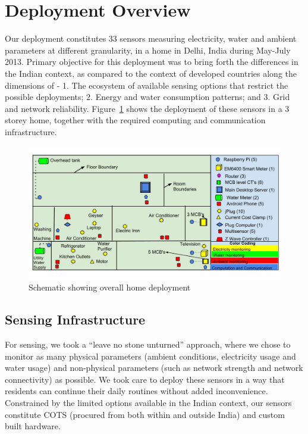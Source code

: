 \documentclass[10pt]{sensys-proc}
\newcommand{\figref}[1]{Figure~\ref{#1}}
\begin{document}
\section{Deployment Overview}
Our deployment constitutes 33 sensors measuring electricity, water and ambient parameters at different granularity, in a home in Delhi, India during May-July 2013. Primary objective for this deployment was to bring forth the differences in the Indian context, as compared to the context of developed countries along the dimensions of - 1. The ecosystem of available sensing options that restrict the possible deployments; 2. Energy and water consumption patterns; and 3. Grid and network reliability. \figref{fig:overall} shows the deployment of these sensors in a 3 storey home, together with the required computing and communication infrastructure. %

\begin{figure} 
	\vspace{-5mm}    
    \includegraphics[scale=0.19]{./figures/overall_deployment.jpg}
    \vspace{-10mm}    
    \caption{Schematic showing overall home deployment}   
    \label{fig:overall}
\end{figure}

\subsection{Sensing Infrastructure}
\label{sec:sensing}
For sensing, we took a ``leave no stone unturned'' approach, where  we chose to monitor as many physical parameters (ambient conditions, electricity usage and water usage) and non-physical parameters (such as network strength and network connectivity) as possible. We took care to deploy these sensors in a way that residents can continue their daily routines without added inconvenience. Constrained by the limited options available in the Indian context, our sensors constitute COTS (procured from both within and outside India) and custom built hardware. %
\end{document}
